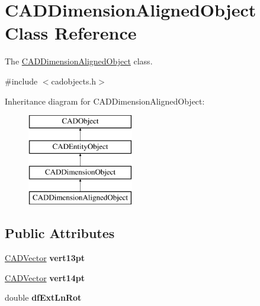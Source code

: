 \hypertarget{class_c_a_d_dimension_aligned_object}{}\section{C\+A\+D\+Dimension\+Aligned\+Object Class Reference}
\label{class_c_a_d_dimension_aligned_object}


The \hyperlink{class_c_a_d_dimension_aligned_object}{C\+A\+D\+Dimension\+Aligned\+Object} class.  




{\ttfamily \#include $<$cadobjects.\+h$>$}

Inheritance diagram for C\+A\+D\+Dimension\+Aligned\+Object\+:\begin{figure}[H]
\begin{center}
\leavevmode
\includegraphics[height=4.000000cm]{class_c_a_d_dimension_aligned_object}
\end{center}
\end{figure}
\subsection*{Public Attributes}
\begin{DoxyCompactItemize}
\item 
\hyperlink{class_c_a_d_vector}{C\+A\+D\+Vector} {\bfseries vert13pt}\hypertarget{class_c_a_d_dimension_aligned_object_adce80725cde5678e9729d1342d6cbca5}{}\label{class_c_a_d_dimension_aligned_object_adce80725cde5678e9729d1342d6cbca5}

\item 
\hyperlink{class_c_a_d_vector}{C\+A\+D\+Vector} {\bfseries vert14pt}\hypertarget{class_c_a_d_dimension_aligned_object_a10afecff9907e633333b3f1aa3185e84}{}\label{class_c_a_d_dimension_aligned_object_a10afecff9907e633333b3f1aa3185e84}

\item 
double {\bfseries df\+Ext\+Ln\+Rot}\hypertarget{class_c_a_d_dimension_aligned_object_a1a7312e5e67400285cbff77eff27b068}{}\label{class_c_a_d_dimension_aligned_object_a1a7312e5e67400285cbff77eff27b068}

\end{DoxyCompactItemize}
